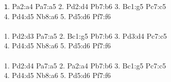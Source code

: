 \documentclass[10pt, conference, compsocconf]{IEEEtran}
\newenvironment{mytinylisting}
{\begin{list}{}{\setlength{\leftmargin}{1em}}\item\small\texttt}
{\end{list}}
\begin{document}

\begin{figure}
\begin{mytinylisting}
1. Pa2:a4 Pa7:a5 2. Pd2:d4 Pb7:b6 3. Bc1:g5 Pc7:c5 \\
4. Pd4:d5 Nb8:a6 5. Pd5:d6 Pf7:f6 \\
\\
1. Pd2:d3 Pa7:a5 2. Bc1:g5 Pb7:b6 3. Pd3:d4 Pc7:c5 \\
4. Pd4:d5 Nb8:a6 5. Pd5:d6 Pf7:f6 \\
\\
1. Pd2:d4 Pa7:a5 2. Pa2:a4 Pb7:b6 3. Bc1:g5 Pc7:c5 \\
4. Pd4:d5 Nb8:a6 5. Pd5:d6 Pf7:f6 \\


\end{mytinylisting}
\end{figure}
\end{document}
